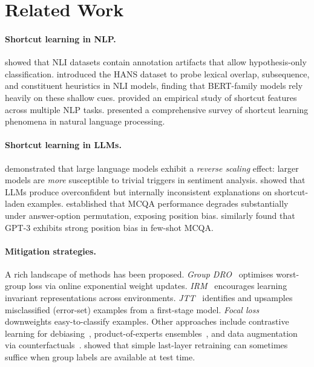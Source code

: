 \documentclass[10pt,twocolumn]{article}
\begin{document}
\section{Related Work}
\label{sec:related}

\paragraph{Shortcut learning in NLP.}
\citet{gururangan2018annotation} showed that NLI datasets
contain annotation artifacts that allow hypothesis-only
classification.
\citet{mccoy2019right} introduced the HANS dataset to probe
lexical overlap, subsequence, and constituent heuristics in
NLI models, finding that BERT-family models rely heavily on
these shallow cues.
\citet{tu2020empirical} provided an empirical study of
shortcut features across multiple NLP tasks.
\citet{du2023shortcut} presented a comprehensive survey of
shortcut learning phenomena in natural language processing.

\paragraph{Shortcut learning in LLMs.}
\citet{tang2023large} demonstrated that large language models
exhibit a \emph{reverse scaling} effect: larger models are
\emph{more} susceptible to trivial triggers in sentiment
analysis.
\citet{yuan2024revisiting} showed that LLMs produce
overconfident but internally inconsistent explanations on
shortcut-laden examples.
\citet{zong2023fool} established that MCQA performance
degrades substantially under answer-option permutation,
exposing position bias.
\citet{zheng2021does} similarly found that GPT-3 exhibits
strong position bias in few-shot MCQA.

\paragraph{Mitigation strategies.}
A rich landscape of methods has been proposed.
\emph{Group DRO}~\citep{sagawa2020distributionally} optimises
worst-group loss via online exponential weight updates.
\emph{IRM}~\citep{arjovsky2019invariant} encourages learning
invariant representations across environments.
\emph{JTT}~\citep{liu2021just} identifies and upsamples
misclassified (error-set) examples from a first-stage model.
\emph{Focal loss}~\citep{lin2017focal} downweights
easy-to-classify examples.
Other approaches include contrastive learning for
debiasing~\citep{clark2019dont}, product-of-experts
ensembles~\citep{he2019unlearn,mahabadi2020end},
and data augmentation via
counterfactuals~\citep{kaushik2020learning,wang2022causal}.
\citet{kirichenko2023last} showed that simple last-layer
retraining can sometimes suffice when group labels are
available at test time.
\end{document}
